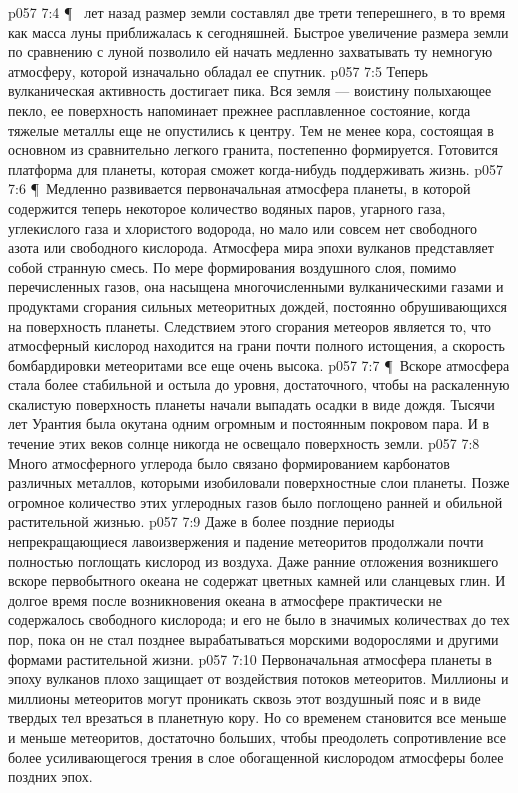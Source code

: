 \vs p057 7:4 \P\  лет назад размер земли составлял две трети теперешнего, в то время как масса луны приближалась к сегодняшней. Быстрое увеличение размера земли по сравнению с луной позволило ей начать медленно захватывать ту немногую атмосферу, которой изначально обладал ее спутник.
\vs p057 7:5 Теперь вулканическая активность достигает пика. Вся земля --- воистину полыхающее пекло, ее поверхность напоминает прежнее расплавленное состояние, когда тяжелые металлы еще не опустились к центру.  Тем не менее кора, состоящая в основном из сравнительно легкого гранита, постепенно формируется. Готовится платформа для планеты, которая сможет когда\hyp{}нибудь поддерживать жизнь.
\vs p057 7:6 \P\ Медленно развивается первоначальная атмосфера планеты, в которой содержится теперь некоторое количество водяных паров, угарного газа, углекислого газа и хлористого водорода, но мало или совсем нет свободного азота или свободного кислорода. Атмосфера мира эпохи вулканов представляет собой странную смесь. По мере формирования воздушного слоя, помимо перечисленных газов, она насыщена многочисленными вулканическими газами и продуктами сгорания сильных метеоритных дождей, постоянно обрушивающихся на поверхность планеты. Следствием этого сгорания метеоров является то, что атмосферный кислород находится на грани почти полного истощения, а скорость бомбардировки метеоритами все еще очень высока.
\vs p057 7:7 \P\ Вскоре атмосфера стала более стабильной и остыла до уровня, достаточного, чтобы на раскаленную скалистую поверхность планеты начали выпадать осадки в виде дождя. Тысячи лет Урантия была окутана одним огромным и постоянным покровом пара. И в течение этих веков солнце никогда не освещало поверхность земли.
\vs p057 7:8 Много атмосферного углерода было связано формированием карбонатов различных металлов, которыми изобиловали поверхностные слои планеты. Позже огромное количество этих углеродных газов было поглощено ранней и обильной растительной жизнью.
\vs p057 7:9 Даже в более поздние периоды непрекращающиеся лавоизвержения и падение метеоритов продолжали почти полностью поглощать кислород из воздуха. Даже ранние отложения возникшего вскоре первобытного океана не содержат цветных камней или сланцевых глин. И долгое время после возникновения океана в атмосфере практически не содержалось свободного кислорода; и его не было в значимых количествах до тех пор, пока он не стал позднее вырабатываться морскими водорослями и другими формами растительной жизни.
\vs p057 7:10 Первоначальная атмосфера планеты в эпоху вулканов плохо защищает от воздействия потоков метеоритов. Миллионы и миллионы метеоритов могут проникать сквозь этот воздушный пояс и в виде твердых тел врезаться в планетную кору. Но со временем становится все меньше и меньше метеоритов, достаточно больших, чтобы преодолеть сопротивление все более усиливающегося трения в слое обогащенной кислородом атмосферы более поздних эпох.
